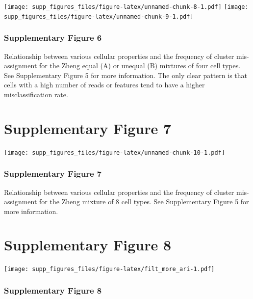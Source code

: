 \documentclass[]{article}
\begin{document}
\texttt{[image: supp\_figures\_files/figure-latex/unnamed-chunk-8-1.pdf]}
\vfill
\texttt{[image: supp\_figures\_files/figure-latex/unnamed-chunk-9-1.pdf]}

\hypertarget{supplementary-figure-6-1}{%
\subsubsection{Supplementary Figure 6}\label{supplementary-figure-6-1}}

Relationship between various cellular properties and the frequency of
cluster mis-assignment for the Zheng equal (A) or unequal (B) mixtures
of four cell types. See Supplementary Figure 5 for more information. The
only clear pattern is that cells with a high number of reads or features
tend to have a higher misclassification rate.

\newpage

\hypertarget{supplementary-figure-7}{%
\section{Supplementary Figure 7}\label{supplementary-figure-7}}

\texttt{[image: supp\_figures\_files/figure-latex/unnamed-chunk-10-1.pdf]}

\hypertarget{supplementary-figure-7-1}{%
\subsubsection{Supplementary Figure 7}\label{supplementary-figure-7-1}}

Relationship between various cellular properties and the frequency of
cluster mis-assignment for the Zheng mixture of 8 cell types. See
Supplementary Figure 5 for more information.

\newpage

\hypertarget{supplementary-figure-8}{%
\section{Supplementary Figure 8}\label{supplementary-figure-8}}

\texttt{[image: supp\_figures\_files/figure-latex/filt\_more\_ari-1.pdf]}

\hypertarget{supplementary-figure-8-1}{%
\subsubsection{Supplementary Figure 8}\label{supplementary-figure-8-1}}
\end{document}

